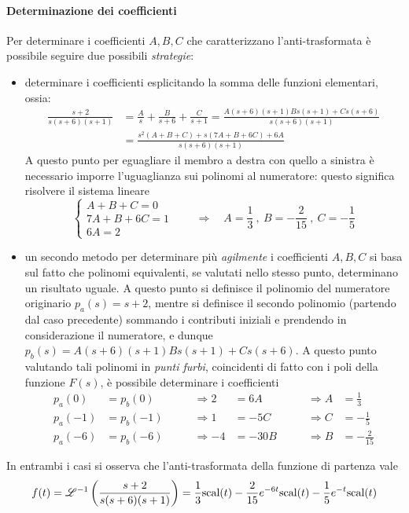 			\paragraph{Determinazione dei coefficienti} Per determinare i coefficienti $A,B,C$ che caratterizzano l'anti-trasformata è possibile seguire due possibili \textit{strategie}:
			\begin{itemize}
				\item determinare i coefficienti esplicitando la somma delle funzioni elementari, ossia:
				\begin{align*}
					\frac{s+2}{s(s+6)(s+1)} & = \frac A s + \frac{B}{s+6} + \frac{C}{s+1} = \frac{ A(s+6)(s+1) Bs(s+1) + Cs(s+6) }{s(s+6)(s+1)} \\
					& = \frac{s^2(A+B+C) + s(7A+B+6C)+6A}{s(s+6)(s+1)}
				\end{align*}
				A questo punto per eguagliare il membro a destra con quello a sinistra è necessario imporre l'uguaglianza sui polinomi al numeratore: questo significa risolvere il sistema lineare
				\[ \begin{cases}
					A+B+C = 0 \\ 7A+B+6C = 1 \\ 6A = 2
				\end{cases} \qquad \Rightarrow \quad A = \frac 1 3 \ , \ B = - \frac 2 {15} \ , \ C= -\frac 1 5 \]
				
				\item un secondo metodo per determinare più \textit{agilmente} i coefficienti $A,B,C$ si basa sul fatto che polinomi equivalenti, se valutati nello stesso punto, determinano un risultato uguale. A questo punto si definisce il polinomio del numeratore originario $p_a (s) = s+2$, mentre si definisce il secondo polinomio (partendo dal caso precedente) sommando i contributi iniziali e prendendo in considerazione il numeratore, e dunque $p_b (s) = A(s+6)(s+1) Bs(s+1) + Cs(s+6)$. A questo punto valutando tali polinomi in \textit{punti furbi}, coincidenti di fatto con i poli della funzione $F(s)$, è possibile determinare i coefficienti
				\begin{align*}
					p_a(0) &= p_b(0) \qquad &\Rightarrow 2 & = 6A \qquad & \Rightarrow A &= \frac 1 3  \\
					p_a(-1) &= p_b(-1) \qquad &\Rightarrow 1 & = -5C \qquad & \Rightarrow C &= - \frac 1 5  \\
					p_a(-6) &= p_b(-6) \qquad &\Rightarrow -4 & = -30B \qquad & \Rightarrow B &= - \frac 2 {15}  
				\end{align*}
				
			\end{itemize}
			In entrambi i casi si osserva che l'anti-trasformata della funzione di partenza vale
			\[ f(t) = \mathscr {L}^{-1} \left( \frac{s+2}{s(s+6)(s+1)} \right) = \frac 1 3\textrm{scal}(t) -\frac 2 {15}e^{-6t}\textrm{scal}(t) - \frac 1 5 e^{-t}\textrm{scal}(t) \]
			
